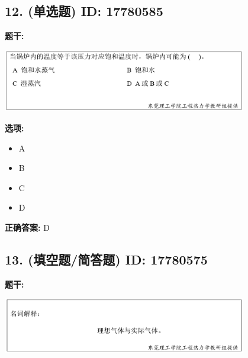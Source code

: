 \documentclass[12pt]{article}
\begin{document}
\vspace{0.5em}\hrulefill\vspace{1em}

\subsection*{12. (单选题) \small ID: 17780585}

\textbf{题干:}


\begin{center}\includegraphics[width=0.8\textwidth, height=0.25\textheight, keepaspectratio]{question_12_17780585/title_img_1.png}\end{center}

\textbf{选项:}
\begin{itemize}[leftmargin=*]
  \item A

  \item B

  \item C

  \item D

\end{itemize}

\textbf{正确答案:}
D

\vspace{0.5em}\hrulefill\vspace{1em}

\subsection*{13. (填空题/简答题) \small ID: 17780575}

\textbf{题干:}


\begin{center}\includegraphics[width=0.8\textwidth, height=0.25\textheight, keepaspectratio]{question_13_17780575/title_img_1.png}\end{center}
\end{document}
